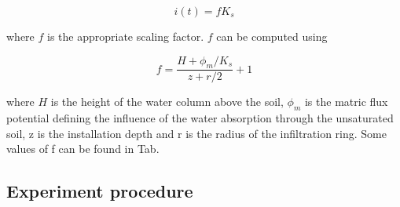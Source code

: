 \documentclass[
10pt, %
a4paper, %
oneside, %
headinclude,footinclude, %
BCOR5mm, %
]{scrartcl}
\begin{document}
\begin{equation}\label{eq_wu}
i(t)= f K_s
\end{equation}

where $f$ is the appropriate scaling factor. $f$ can be computed using 

\begin{equation}\label{eq_wuf}
f=\frac{H+\phi_m/K_s}{z+r/2}+1
\end{equation}

where $H$ is the height of the water column above the soil, $\phi_m$ is the matric flux potential defining the influence of the water absorption through the unsaturated soil, z is the installation depth and r is the radius of the infiltration ring. Some values of f can be found in Tab.

\begin{table}[!h]
	\centering
	\caption{\label{tab_heat}Values for the scaling factor f Eq. \ref{eq_wuf} \cite{wu1997generalized}. The values are for z=5cm,H=5cm and an initial pressure head of pF$=3$.}
\end{table}

 \subsection{Experiment procedure}
\end{document}

